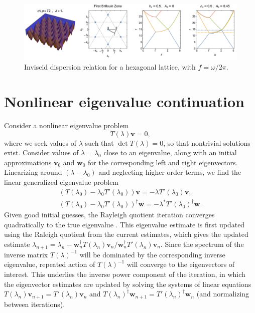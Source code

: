 \documentclass[aps,pre,amsmath,amssymb,floatfix,onecolumn,notitlepage,10pt]{revtex4-1}
\begin{document}
\begin{figure}[hbt]
\includegraphics[width=\columnwidth]{hexagonal}
\caption{Inviscid dispersion relation for a hexagonal lattice, with $f=\omega/2\pi$. \label{fig2}}
\end{figure}

\section{Nonlinear eigenvalue continuation}
Consider a nonlinear eigenvalue problem
\begin{equation}
T(\lambda) \mathbf{v} = 0,
\end{equation}
where we seek values of $\lambda$ such that $\det T(\lambda)=0$, so that nontrivial solutions exist. Consider values of $\lambda=\lambda_0$ close to an eigenvalue, along with an initial approximations $\mathbf{v}_0$ and $\mathbf{w}_0$ for the corresponding left and right eigenvectors. Linearizing around $(\lambda-\lambda_0)$ and neglecting higher order terms, we find the linear generalized eigenvalue problem
\begin{align}
(T(\lambda_0)-\lambda_0 T'(\lambda_0))\mathbf{v} = -\lambda T'(\lambda_0) \mathbf{v}, \\
(T(\lambda_0)-\lambda_0 T'(\lambda_0))^\dagger \mathbf{w} = -\lambda^* T'(\lambda_0)^\dagger \mathbf{w}.
\end{align}
Given good initial guesses, the Rayleigh quotient iteration converges quadratically to the true eigenvalue \cite{1973_Ruhe}. This eigenvalue estimate is first updated using the Raleigh quotient from the current estimates, which gives  the updated estimate $\lambda_{n+1} = \lambda_n - \mathbf{w}_n^\dagger T(\lambda_n) \mathbf{v}_n /  \mathbf{w}_n^\dagger T'(\lambda_n) \mathbf{v}_n$. Since the spectrum of the inverse matrix $T(\lambda)^{-1}$ will be dominated by the corresponding inverse eigenvalue, repeated action of $T(\lambda)^{-1}$ will converge to the eigenvectors of interest. This underlies the inverse power component of the iteration, in which the eigenvector estimates are updated by solving the systems of linear equations $T(\lambda_n) \mathbf{v}_{n+1} = T'(\lambda_n)\mathbf{v}_n$ and $T(\lambda_n)^\dagger \mathbf{w}_{n+1} = T'(\lambda_n)^\dagger \mathbf{w}_n$ (and normalizing between iterations).
\end{document}
